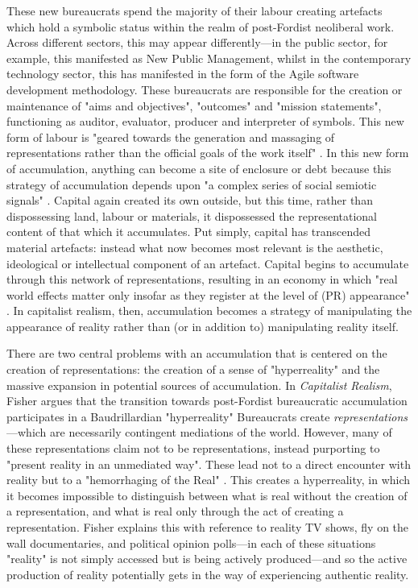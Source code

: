 These new bureaucrats spend the majority of their labour creating artefacts which hold a symbolic status within the realm of post-Fordist neoliberal work. Across different sectors, this may appear differently—in the public sector, for example, this manifested as New Public Management, whilst in the contemporary technology sector, this has manifested in the form of the Agile software development methodology. These bureaucrats are responsible for the creation or maintenance of "aims and objectives", "outcomes" and "mission statements", functioning as auditor, evaluator, producer and interpreter of symbols. This new form of labour is "geared towards the generation and massaging of representations rather than the official goals of the work itself" \citep[p. 46]{fisher_capitalist_2009}. In this new form of accumulation, anything can become a site of enclosure or debt because this strategy of accumulation depends upon "a complex series of social semiotic signals" \citep[p. 54]{fisher_capitalist_2009}. Capital again created its own outside, but this time, rather than dispossessing land, labour or materials, it dispossessed the representational content of that which it accumulates. Put simply, capital has transcended material artefacts: instead what now becomes most relevant is the aesthetic, ideological or intellectual component of an artefact. Capital begins to accumulate through this network of representations, resulting in an economy in which "real world effects matter only insofar as they register at the level of (PR) appearance" \citep[p. 46]{fisher_capitalist_2009}. In capitalist realism, then, accumulation becomes a strategy of manipulating the appearance of reality rather than (or in addition to) manipulating reality itself.  

There are two central problems with an accumulation that is centered on the creation of representations: the creation of a sense of "hyperreality" and the massive expansion in potential sources of accumulation. In \emph{Capitalist Realism}, Fisher argues that the transition towards post-Fordist bureaucratic accumulation participates in a Baudrillardian "hyperreality" \citeyearpar[p. 52]{fisher_capitalist_2009} Bureaucrats create \emph{representations}—which are necessarily contingent mediations of the world. However, many of these representations claim not to be representations, instead purporting to "present reality in an unmediated way". These lead not to a direct encounter with reality but to a "hemorrhaging of the Real" \citep[p. 52]{fisher_capitalist_2009}. This creates a hyperreality, in which it becomes impossible to distinguish between what is real without the creation of a representation, and what is real only through the act of creating a representation. Fisher explains this with reference to reality TV shows, fly on the wall documentaries, and political opinion polls—in each of these situations "reality" is not simply accessed but is being actively produced—and so the active production of  reality potentially gets in the way of experiencing authentic reality. 

